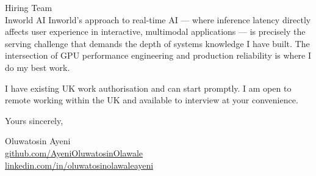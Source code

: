 \documentclass[12pt,a4paper]{letter}
\begin{document}
\begin{letter}{Hiring Team \\ Inworld AI}
Inworld's approach to real-time AI — where inference latency directly affects user experience in interactive, multimodal applications — is precisely the serving challenge that demands the depth of systems knowledge I have built. The intersection of GPU performance engineering and production reliability is where I do my best work.

I have existing UK work authorisation and can start promptly. I am open to remote working within the UK and available to interview at your convenience.

\closing{Yours sincerely,}

Oluwatosin Ayeni \\
\href{https://github.com/AyeniOluwatosinOlawale}{github.com/AyeniOluwatosinOlawale} \\
\href{https://www.linkedin.com/in/oluwatosinolawaleayeni/}{linkedin.com/in/oluwatosinolawaleayeni}

\end{letter}
\end{document}
